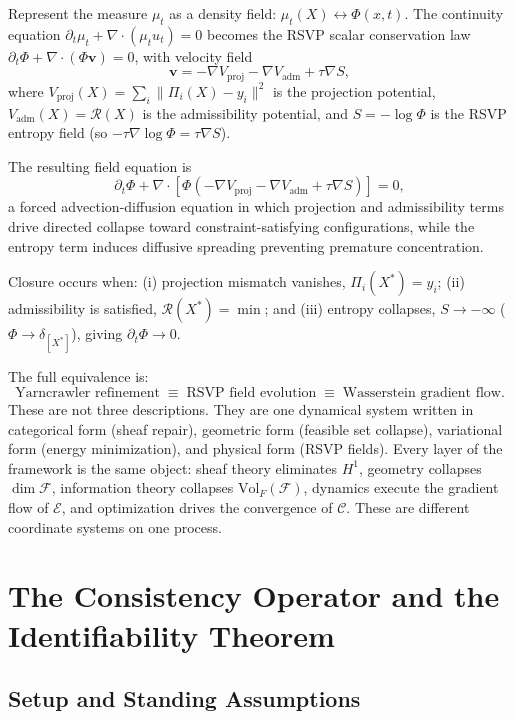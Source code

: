 \documentclass[12pt, oneside]{article}
\begin{document}
Represent the measure $\mu_t$ as a density field: $\mu_t(X) \leftrightarrow \Phi(x,t)$.
The continuity equation $\partial_t \mu_t + \nabla\cdot(\mu_t u_t) = 0$ becomes the
RSVP scalar conservation law $\partial_t \Phi + \nabla\cdot(\Phi\mathbf{v}) = 0$,
with velocity field
\[
\mathbf{v} = -\nabla V_{\mathrm{proj}} - \nabla V_{\mathrm{adm}} + \tau \nabla S,
\]
where $V_{\mathrm{proj}}(X) = \sum_i \|\Pi_i(X) - y_i\|^2$ is the projection potential,
$V_{\mathrm{adm}}(X) = \mathcal{R}(X)$ is the admissibility potential, and
$S = -\log\Phi$ is the RSVP entropy field (so $-\tau\nabla\log\Phi = \tau\nabla S$).

The resulting field equation is
\[
\partial_t \Phi + \nabla\cdot\!\left[
\Phi\!\left(-\nabla V_{\mathrm{proj}} - \nabla V_{\mathrm{adm}} + \tau\nabla S\right)
\right] = 0,
\]
a forced advection-diffusion equation in which projection and admissibility terms drive
directed collapse toward constraint-satisfying configurations, while the entropy term
induces diffusive spreading preventing premature concentration.

Closure occurs when: (i) projection mismatch vanishes, $\Pi_i(X^*) = y_i$; (ii)
admissibility is satisfied, $\mathcal{R}(X^*) = \min$; and (iii) entropy collapses,
$S \to -\infty$ ($\Phi \to \delta_{[X^*]}$), giving $\partial_t\Phi \to 0$.

The full equivalence is:
\[
\text{Yarncrawler refinement}
\;\equiv\;
\text{RSVP field evolution}
\;\equiv\;
\text{Wasserstein gradient flow.}
\]
These are not three descriptions. They are one dynamical system written in categorical
form (sheaf repair), geometric form (feasible set collapse), variational form (energy
minimization), and physical form (RSVP fields). Every layer of the framework is the same
object: sheaf theory eliminates $H^1$, geometry collapses $\dim\mathcal{F}$, information
theory collapses $\mathrm{Vol}_F(\mathcal{F})$, dynamics execute the gradient flow of
$\mathcal{E}$, and optimization drives the convergence of $\mathcal{C}$. These are
different coordinate systems on one process.

\section{The Consistency Operator and the Identifiability Theorem}
\label{sec:identifiability}

\subsection{Setup and Standing Assumptions}
\end{document}
